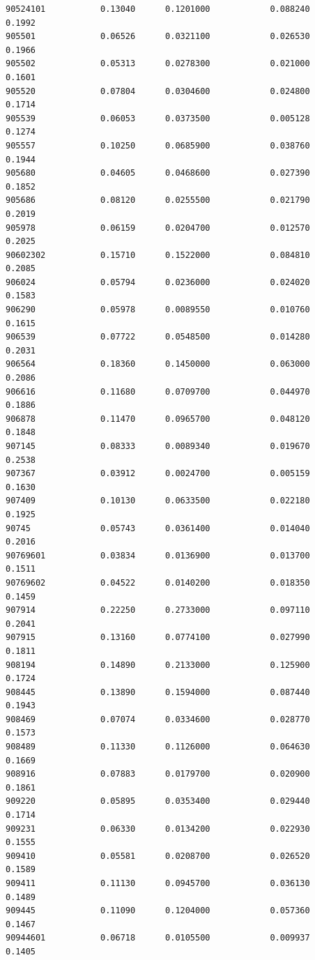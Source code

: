 \documentclass[
  letterpaper,
  DIV=11,
  numbers=noendperiod]{scrartcl}
\begin{document}
\begin{verbatim}
90524101           0.13040      0.1201000            0.088240        0.1992
905501             0.06526      0.0321100            0.026530        0.1966
905502             0.05313      0.0278300            0.021000        0.1601
905520             0.07804      0.0304600            0.024800        0.1714
905539             0.06053      0.0373500            0.005128        0.1274
905557             0.10250      0.0685900            0.038760        0.1944
905680             0.04605      0.0468600            0.027390        0.1852
905686             0.08120      0.0255500            0.021790        0.2019
905978             0.06159      0.0204700            0.012570        0.2025
90602302           0.15710      0.1522000            0.084810        0.2085
906024             0.05794      0.0236000            0.024020        0.1583
906290             0.05978      0.0089550            0.010760        0.1615
906539             0.07722      0.0548500            0.014280        0.2031
906564             0.18360      0.1450000            0.063000        0.2086
906616             0.11680      0.0709700            0.044970        0.1886
906878             0.11470      0.0965700            0.048120        0.1848
907145             0.08333      0.0089340            0.019670        0.2538
907367             0.03912      0.0024700            0.005159        0.1630
907409             0.10130      0.0633500            0.022180        0.1925
90745              0.05743      0.0361400            0.014040        0.2016
90769601           0.03834      0.0136900            0.013700        0.1511
90769602           0.04522      0.0140200            0.018350        0.1459
907914             0.22250      0.2733000            0.097110        0.2041
907915             0.13160      0.0774100            0.027990        0.1811
908194             0.14890      0.2133000            0.125900        0.1724
908445             0.13890      0.1594000            0.087440        0.1943
908469             0.07074      0.0334600            0.028770        0.1573
908489             0.11330      0.1126000            0.064630        0.1669
908916             0.07883      0.0179700            0.020900        0.1861
909220             0.05895      0.0353400            0.029440        0.1714
909231             0.06330      0.0134200            0.022930        0.1555
909410             0.05581      0.0208700            0.026520        0.1589
909411             0.11130      0.0945700            0.036130        0.1489
909445             0.11090      0.1204000            0.057360        0.1467
90944601           0.06718      0.0105500            0.009937        0.1405

\end{verbatim}
\end{document}
